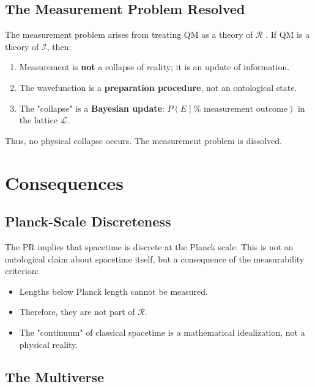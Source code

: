 \documentclass[aps,preprint,showpacs,showkeys]{revtex4}%
\begin{document}
\subsection{The Measurement Problem Resolved}

The measurement problem arises from treating QM as a theory of $\mathcal{R}$%
. If QM is a theory of $\mathcal{I}$, then:

\begin{enumerate}
\item Measurement is \textbf{not} a collapse of reality; it is an update of
information.

\item The wavefunction is a \textbf{preparation procedure}, not an
ontological state.

\item The "collapse" is a \textbf{Bayesian update}: $P(E \mid \text{%
measurement outcome})$ in the lattice $\mathcal{L}$.
\end{enumerate}

Thus, no physical collapse occurs. The measurement problem is dissolved.

\section{Consequences}

\subsection{Planck-Scale Discreteness}

The PR implies that spacetime is discrete at the Planck scale. This is not
an ontological claim about spacetime itself, but a consequence of the
measurability criterion:

\begin{itemize}
\item Lengths below Planck length cannot be measured.

\item Therefore, they are not part of $\mathcal{R}$.

\item The "continuum" of classical spacetime is a mathematical idealization,
not a physical reality.
\end{itemize}

\subsection{The Multiverse}
\end{document}
